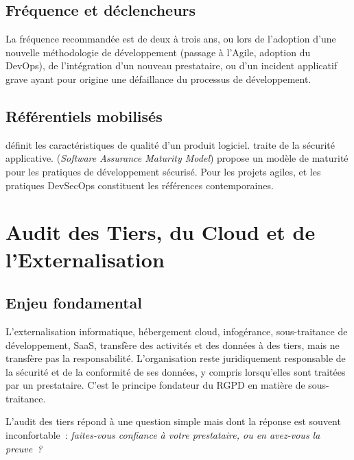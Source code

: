 \subsection{Fréquence et déclencheurs}

La fréquence recommandée est de deux à trois ans, ou lors de l'adoption d'une
nouvelle méthodologie de développement (passage à l'Agile, adoption du DevOps),
de l'intégration d'un nouveau prestataire, ou d'un incident applicatif grave ayant
pour origine une défaillance du processus de développement.

\subsection{Référentiels mobilisés}

 définit les caractéristiques de qualité d'un produit logiciel.
 traite de la sécurité applicative. 
(\textit{Software Assurance Maturity Model}) propose un modèle de maturité pour les
pratiques de développement sécurisé. Pour les projets agiles,  et les
pratiques DevSecOps constituent les références contemporaines.


\section{Audit des Tiers, du Cloud et de l'Externalisation}
\label{sec:audit-tiers}

\subsection{Enjeu fondamental}

L'externalisation informatique, hébergement cloud, infogérance, sous-traitance de
développement, SaaS, transfère des activités et des données à des tiers, mais ne
transfère pas la responsabilité. L'organisation reste juridiquement responsable de
la sécurité et de la conformité de ses données, y compris lorsqu'elles sont traitées
par un prestataire. C'est le principe fondateur du RGPD en matière de sous-traitance.

L'audit des tiers répond à une question simple mais dont la réponse est souvent
inconfortable~: \textit{faites-vous confiance à votre prestataire, ou en avez-vous
la preuve~?}

